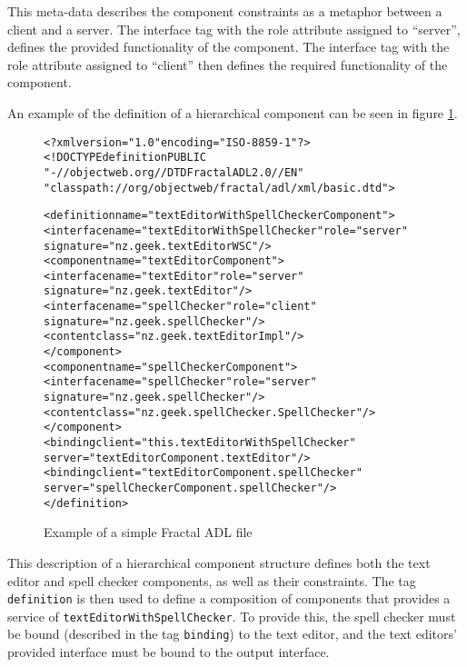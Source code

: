 This meta-data describes the component constraints as a metaphor between a client and a server.
The interface tag with the role attribute assigned to ``server'', defines the provided functionality of the component.
The interface tag with the role attribute assigned to ``client'' then defines the required functionality of the component.  

An example of the definition of a hierarchical component can be seen in figure \ref{fractalrecursve}.

\begin{figure}[htp]
\begin{center}
\begin{alltt}
<?xml version="1.0" encoding="ISO-8859-1" ?>
<!DOCTYPE definition PUBLIC 
    "-//objectweb.org//DTD Fractal ADL 2.0//EN" 
    "classpath://org/objectweb/fractal/adl/xml/basic.dtd">

<definition name="textEditorWithSpellCheckerComponent">
  <interface name="textEditorWithSpellChecker" role="server" 
   signature="nz.geek.textEditorWSC"/>
  <component name="textEditorComponent">
    <interface name="textEditor" role="server" 
     signature="nz.geek.textEditor"/>
    <interface name="spellChecker" role="client" 
     signature="nz.geek.spellChecker"/>
    <content class="nz.geek.textEditorImpl"/>
  </component>
  <component name="spellCheckerComponent">
    <interface name="spellChecker" role="server" 
     signature="nz.geek.spellChecker"/>
    <content class="nz.geek.spellChecker.SpellChecker"/>
  </component>
  <binding client="this.textEditorWithSpellChecker" 
   server="textEditorComponent.textEditor"/>
  <binding client="textEditorComponent.spellChecker" 
   server="spellCheckerComponent.spellChecker"/>
</definition>
\end{alltt}
  \caption{Example of a simple Fractal ADL file}
  \label{fractalrecursve}
\end{center}
\end{figure}

This description of a hierarchical component structure defines both the text editor and spell checker components, as well as their constraints.
The tag \texttt{definition} is then used to define a composition of components that provides a service of \texttt{textEditorWithSpellChecker}.
To provide this, the spell checker must be bound (described in the tag \texttt{binding}) to the text editor,
and the text editors' provided interface must be bound to the output interface. 

